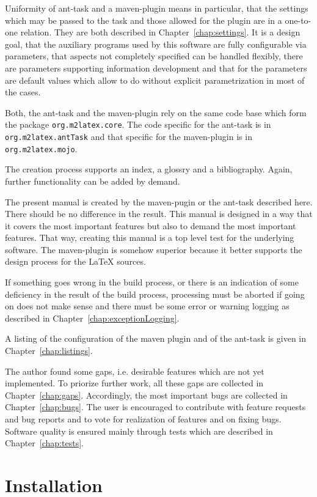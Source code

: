 \documentclass[12pt]{book}
\renewcommand{\index}[1]{ }
\begin{document}
Uniformity of ant-task and a maven-plugin means in particular, 
that the settings which may be passed to the task 
and those allowed for the plugin are in a one-to-one relation. 
They are both described in Chapter~\ref{chap:settings}. 
It is a design goal, that the auxiliary programs 
used by this software are fully configurable via parameters, 
that aspects not completely specified can be handled flexibly, 
there are parameters supporting information development 
and that for the parameters are default values 
which allow to do without explicit parametrization in most of the cases. 
\index{ant-task}
Both, the ant-task and the maven-plugin rely on the same code base 
which form the package \texttt{org.m2latex.core}. 
The code specific for the ant-task is in \texttt{org.m2latex.antTask} 
and that specific for the maven-plugin is in \texttt{org.m2latex.mojo}. 


The creation process supports an index, a glossry and a bibliography. 
Again, further functionality can be added by demand. 

The present manual is created by the maven-pugin or the ant-task 
described here. 
There should be no difference in the result. 
This manual is designed in a way that it covers the most important features 
but also to demand the most important features. 
That way, creating this manual is a top level test 
for the underlying software. 
The maven-plugin is somehow superior 
because it better supports the design process for the \LaTeX{} sources. 

If something goes wrong in the build process, 
or there is an indication 
of some deficiency in the result of the build process, 
processing must be aborted if going on does not make sense 
and there must be some error or warning logging 
as described in Chapter~\ref{chap:exceptionLogging}. 

A listing of the configuration of the maven plugin and of the ant-task 
is given in Chapter~\ref{chap:listings}. 

The author found some gaps, i.e. desirable features 
which are not yet implemented. 
To priorize further work, 
all these gaps are collected in Chapter~\ref{chap:gaps}. 
Accordingly, the most important bugs are collected in
Chapter~\ref{chap:bugs}. 
The user is encouraged to contribute with feature requests 
and bug reports and to vote for realization of features 
and on fixing bugs. 
Software quality is ensured mainly through tests 
which are described in Chapter~\ref{chap:tests}. 


\chapter{Installation}\label{chap:install}
\end{document}
